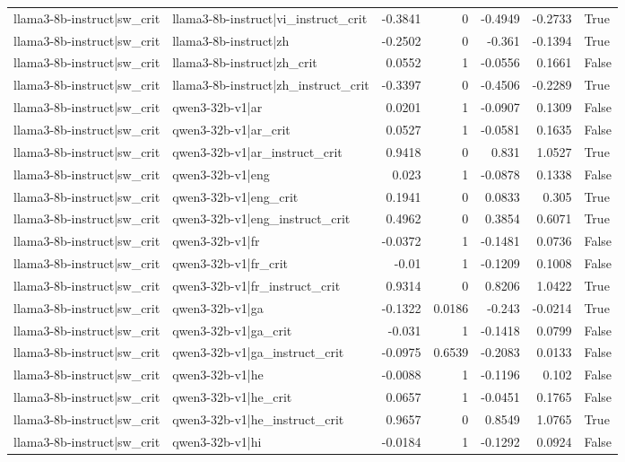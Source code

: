 \begin{table}
\begin{tabular}{l l r r r r l}
llama3-8b-instruct|sw_crit & llama3-8b-instruct|vi_instruct_crit & -0.3841 & 0 & -0.4949 & -0.2733 & True \\
llama3-8b-instruct|sw_crit & llama3-8b-instruct|zh & -0.2502 & 0 & -0.361 & -0.1394 & True \\
llama3-8b-instruct|sw_crit & llama3-8b-instruct|zh_crit & 0.0552 & 1 & -0.0556 & 0.1661 & False \\
llama3-8b-instruct|sw_crit & llama3-8b-instruct|zh_instruct_crit & -0.3397 & 0 & -0.4506 & -0.2289 & True \\
llama3-8b-instruct|sw_crit & qwen3-32b-v1|ar & 0.0201 & 1 & -0.0907 & 0.1309 & False \\
llama3-8b-instruct|sw_crit & qwen3-32b-v1|ar_crit & 0.0527 & 1 & -0.0581 & 0.1635 & False \\
llama3-8b-instruct|sw_crit & qwen3-32b-v1|ar_instruct_crit & 0.9418 & 0 & 0.831 & 1.0527 & True \\
llama3-8b-instruct|sw_crit & qwen3-32b-v1|eng & 0.023 & 1 & -0.0878 & 0.1338 & False \\
llama3-8b-instruct|sw_crit & qwen3-32b-v1|eng_crit & 0.1941 & 0 & 0.0833 & 0.305 & True \\
llama3-8b-instruct|sw_crit & qwen3-32b-v1|eng_instruct_crit & 0.4962 & 0 & 0.3854 & 0.6071 & True \\
llama3-8b-instruct|sw_crit & qwen3-32b-v1|fr & -0.0372 & 1 & -0.1481 & 0.0736 & False \\
llama3-8b-instruct|sw_crit & qwen3-32b-v1|fr_crit & -0.01 & 1 & -0.1209 & 0.1008 & False \\
llama3-8b-instruct|sw_crit & qwen3-32b-v1|fr_instruct_crit & 0.9314 & 0 & 0.8206 & 1.0422 & True \\
llama3-8b-instruct|sw_crit & qwen3-32b-v1|ga & -0.1322 & 0.0186 & -0.243 & -0.0214 & True \\
llama3-8b-instruct|sw_crit & qwen3-32b-v1|ga_crit & -0.031 & 1 & -0.1418 & 0.0799 & False \\
llama3-8b-instruct|sw_crit & qwen3-32b-v1|ga_instruct_crit & -0.0975 & 0.6539 & -0.2083 & 0.0133 & False \\
llama3-8b-instruct|sw_crit & qwen3-32b-v1|he & -0.0088 & 1 & -0.1196 & 0.102 & False \\
llama3-8b-instruct|sw_crit & qwen3-32b-v1|he_crit & 0.0657 & 1 & -0.0451 & 0.1765 & False \\
llama3-8b-instruct|sw_crit & qwen3-32b-v1|he_instruct_crit & 0.9657 & 0 & 0.8549 & 1.0765 & True \\
llama3-8b-instruct|sw_crit & qwen3-32b-v1|hi & -0.0184 & 1 & -0.1292 & 0.0924 & False \\

\end{tabular}
\end{table}
